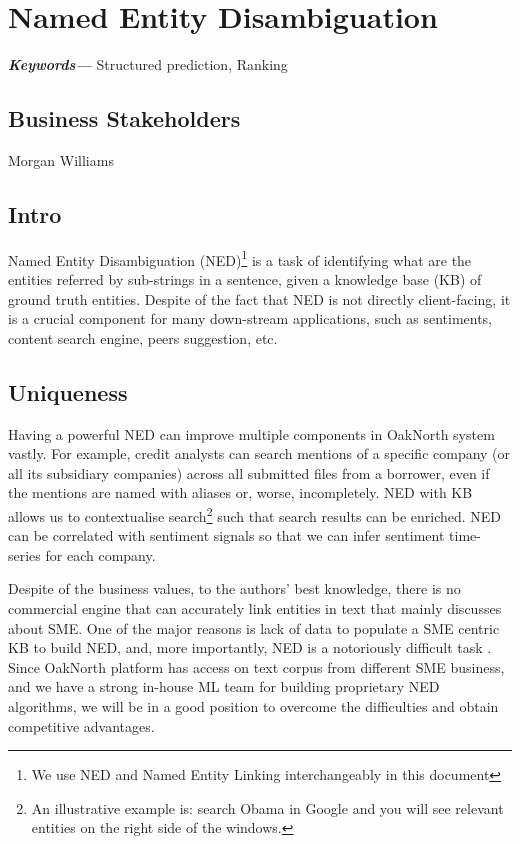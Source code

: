 \documentclass[]{article}
\providecommand{\keywords}[1]{\textbf{\textit{Keywords---}} #1}
\begin{document}
\section{Named Entity Disambiguation}
\keywords{Structured prediction, Ranking}

\subsection{Business Stakeholders}
Morgan Williams

\subsection{Intro}
Named Entity Disambiguation (NED)\footnote{We use NED and Named Entity Linking 
interchangeably in this document} is a task of identifying what are the 
entities referred by sub-strings in a sentence, given a knowledge base (KB) of 
ground truth entities. Despite of the fact that NED is not directly 
client-facing, it is a crucial component for many down-stream applications, 
such as sentiments, content search engine, peers suggestion, etc. 

\subsection{Uniqueness}
Having a powerful NED can improve multiple components in OakNorth system 
vastly. For example, credit analysts can search mentions of a specific company 
(or all its subsidiary companies) across all submitted files from a borrower, 
even if the mentions are named with aliases or, worse, incompletely. NED with 
KB 
allows us to contextualise search\cite{voskarides2018weakly}\footnote{An 
illustrative example is: search Obama in Google and you will see relevant 
entities on the right side of the windows. } such that search results can be 
enriched. NED can be correlated with sentiment signals so that we can infer 
sentiment time-series for each company. 

Despite of the business values, to the authors' best knowledge, there is no 
commercial engine that can accurately link entities in text that mainly 
discusses about SME. 
One of the major reasons is lack of data to populate a SME centric KB to build 
NED, and, more importantly, NED is a notoriously 
difficult task \cite{hoffart-etal-2011-robust, ji2010overview, guo2014entity, 
globerson-etal-2016-collective}. Since OakNorth platform has access on text 
corpus from different SME business, and we have a strong in-house ML team for 
building proprietary NED algorithms, we will be in a good position to overcome 
the difficulties and obtain competitive advantages.
\end{document}
